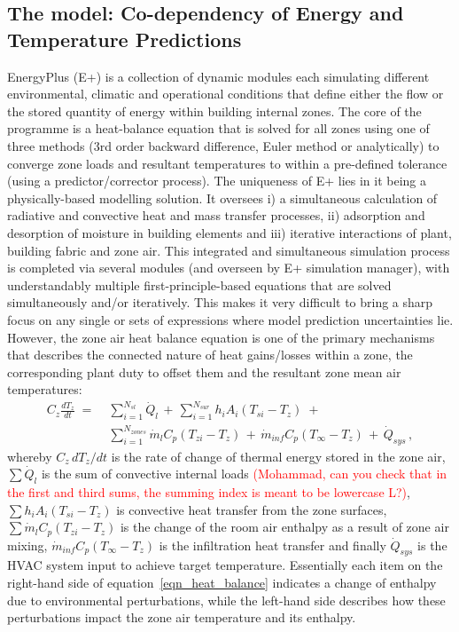 \documentclass[preprint,12pt, sort&compress]{elsarticle}
\begin{document}

\subsection{The model: Co-dependency of Energy and Temperature Predictions}
EnergyPlus (E+) is a collection of dynamic modules each simulating different environmental, climatic and operational conditions that define either the flow or the stored quantity of energy within building internal zones. The core of the programme is a heat-balance equation that is solved for all zones using one of three methods (3rd order backward difference, Euler method or analytically) to converge zone loads and resultant temperatures to within a pre-defined tolerance (using a predictor/corrector process). The uniqueness of E+ lies in it being a physically-based modelling solution. It oversees i) a simultaneous calculation of radiative and convective heat and mass transfer processes, ii) adsorption and desorption of moisture in building elements and iii) iterative interactions of plant, building fabric and zone air. This integrated and simultaneous simulation process is completed via several modules (and overseen by E+ simulation manager), with understandably multiple first-principle-based equations that are solved simultaneously and/or iteratively. This makes it very difficult to bring a sharp focus on any single or sets of expressions where model prediction uncertainties lie. However, the zone air heat balance equation is one of the primary mechanisms that describes the connected nature of heat gains/losses within a zone, the corresponding plant duty to offset them and the resultant zone mean air temperatures:
\begin{align}\label{eqn_heat_balance}
C_z \frac{dT_z}{dt} \;=\; &\sum_{i=1}^{N_{sl}} \dot{Q}_l \,+\, \sum_{i=1}^{N_{sur}} h_i A_i (T_{si}-T_z) \;+ \nonumber \\
&\sum_{i=1}^{N_{zones}} \dot m_l C_p (T_{zi}-T_z) \,+\, \dot m_{inf} C_p (T_\infty - T_z) 
\, +\,\dot Q_{sys}\,,
\end{align}
whereby 
$C_z \, dT_z/dt$ is the rate of change of thermal energy stored in the zone air, 
$\sum \dot{Q}_l$ is the sum of convective internal loads \textcolor{red}{(Mohammad, can you check that in the first and third sums, the summing index is meant to be lowercase L?)},
$\sum h_i A_i (T_{si}-T_z)$ is convective heat transfer from the zone surfaces, 
$\sum \dot m_l C_p (T_{zi}-T_z) $ is the change of the room air enthalpy as a result of zone air mixing, 
$\dot m_{inf} C_p (T_\infty - T_z)$ is the infiltration heat transfer
and finally $\dot Q_{sys}$ is the HVAC system input to achieve target temperature. Essentially each item on the right-hand side of equation~\eqref{eqn_heat_balance} indicates a change of enthalpy due to environmental perturbations, while the left-hand side describes how these perturbations impact the zone air temperature and its enthalpy.
\end{document}
